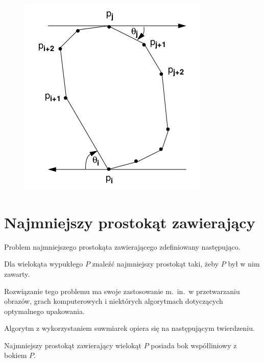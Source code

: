 \begin{figure}[htb]
  \centering
  \includegraphics[scale=0.5]{img/calipers1}
  \caption{\label{img:calipers1}}
\end{figure}


\section{Najmniejszy prostokąt zawierający}
Problem najmniejszego prostokąta zawierającego zdefiniowany
następująco.

\begin{problem}
  Dla wielokąta wypukłego $P$ znaleźć najmniejszy prostokąt taki, żeby
  $P$ był w nim zawarty.
\end{problem}

Rozwiązanie tego problemu ma swoje zastosowanie m.\ in.\ w
przetwarzaniu obrazów, grach komputerowych i niektórych algorytmach
dotyczących optymalnego upakowania.

Algorytm z wykorzystaniem suwmiarek opiera się na następującym
twierdzeniu.

\begin{twierdzenie}
  Najmniejszy prostokąt zawierający wielokąt $P$ posiada bok
  współliniowy z bokiem $P$.
\end{twierdzenie}

